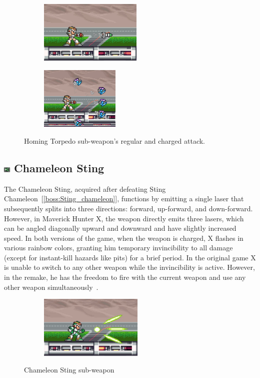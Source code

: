 \begin{figure}[htp]
	\centering
	\begin{subfigure}{0.4\linewidth}
		\includegraphics[height=3cm]{figures/X1/weapons/Homing_torpedo_1.jpg}	
	\end{subfigure}
	\begin{subfigure}{0.4\linewidth}
		\includegraphics[height=3cm]{figures/X1/weapons/Homing_torpedo_2.jpg}	
	\end{subfigure}
	\caption{Homing Torpedo sub-weapon's regular and charged attack.}
\end{figure}

\subsection{\includegraphics[width=12px, height=10px]{figures/X1/weapons/C_sting.jpg} Chameleon Sting}\label{Chameleon_sting}

The Chameleon Sting, acquired after defeating Sting Chameleon~[\ref{boss:Sting_chameleon}], functions by emitting a single laser that subsequently splits into three directions: forward, up-forward, and down-forward. However, in Maverick Hunter X, the weapon directly emits three lasers, which can be angled diagonally upward and downward and have slightly increased speed. In both versions of the game, when the weapon is charged, X flashes in various rainbow colors, granting him temporary invincibility to all damage (except for instant-kill hazards like pits) for a brief period. In the original game X is unable to switch to any other weapon while the invincibility is active. However, in the remake, he has the freedom to fire with the current weapon and use any other weapon simultaneously~\cite{wiki:Chameleon_sting}. 
\begin{figure}[htp]
	\centering
	\begin{subfigure}{0.4\linewidth}
		\includegraphics[height=3cm]{figures/X1/weapons/Chameleon_sting.jpg}
	\end{subfigure}
	\caption{Chameleon Sting sub-weapon}
\end{figure}

